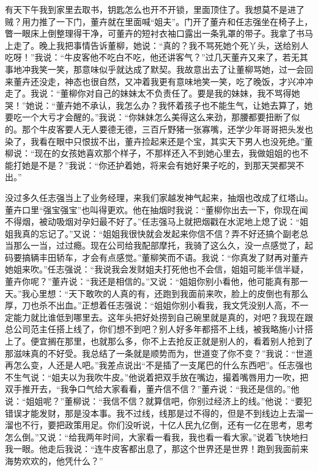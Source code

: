 \documentclass[12pt,oneside]{book}
\begin{document}
有天下午我到家里去取书，钥匙怎么也开不开锁，里面顶住了。我想莫不是进了贼？用力推了一下门，董卉就在里面喊``姐夫''。门开了董卉和任志强坐在椅子上，瞥一眼床上倒整理得干净，可董卉的短衬衣袖口露出一条乳罩的带子。我拿了书马上走了。晚上我把事情告诉董柳，她说：``真的？我不骂死她个死丫头，送给别人吃呀！''我说：``牛皮客他不吃白不吃，他还讲客气？''过几天董卉又来了，若无其事地冲我笑一笑，那意味似乎就达成了默契。我故意出去了让董柳骂她，过一会回来董卉还没走，神态也很自然，又冲着我更有意味地笑一笑，吃了晚饭，才兴冲冲走了。我说：``董柳你对自己的妹妹太不负责任了。要是我的妹妹，我不骂得她哭！''她说：``董卉她不承认，我怎么办？我怀着孩子也不能生气，让她去算了，她要吃一个大亏才会醒的。''我说：``你妹妹怎么美得这么来劲，那腰都要扭断了似的。那个牛皮客要人无人要德无德，三百斤野猪一张寡嘴，还学少年哥哥把头发也染了，我看在眼中只恨拔不出，董卉捡起来还是个宝，其实天下男人也没死绝。''董柳说：``现在的女孩她喜欢那个样子，不那样还入不到她心里去，我做姐姐的也不能打她是不是？''我说：``你还护着她，将来会有她好果子吃的，到那天哭都哭不出。''

没过多久任志强当上了业务经理，来我们家越发神气起来，抽烟也改成了红塔山。董卉口里``强宝强宝''也叫得更欢。他在抽烟时我说：``董柳你出去一下，你现在闻不得烟，被动吸烟对孕妇最不好了。''任志强马上就把烟戳在水泥地上熄了说：``姐姐我真的忘记了。''又说：``姐姐我很快就会发起来你信不信？弄不好还搞个副老总当那么一当，过过瘾。现在公司给我配部摩托，我骑了这么久，没一点感觉了，起码要搞辆丰田轿车，才会有点感觉。''董柳笑而不语。我说：``你真发了财再对董卉她姐来吹。''任志强说：``我说我会发财姐夫打死他也不会信，姐姐可能半信半疑，董卉你呢？''董卉说：``我还是相信的。''又说：``姐姐你别小看他，他可能真有那一天。''我心里想：``天下敢吹的人真的有，还跑到我面前来吹，脸上的皮倒也有那么厚，刀也杀不出血。''正想着任志强说：``姐姐你别小看我，我文凭没别人高，不一定能力就比谁低到哪里去。这年头把好处捞到自己碗里就是真的，对吧？我现在跟总公司范主任搭上线了，你们想不到吧？别人好多年都搭不上线，被我略施小计搭上了。便宜搁在那里，也就那么多，你不上去抢反正就是别人的，看着别人抢到了那滋味真的不好受。我总结了一条就是顺势而为，世道变了你不变？''我说：``世道再怎么变，人还是人吧。''我差点说出``不是插了一支尾巴的什么东西吧''。任志强也不生气说：``姐夫以为我吹牛皮。''他说着把双手放在嘴边，撮着嘴唇用力一吹，把双手推开去，``我争口气给大家看看，董卉信不信？''董卉说：``我还是信的。''他说：``姐姐呢？''董柳说：``我信不信？就算信吧，你别过经济上的线。''他说：``要犯错误才能发财，那是没本事。我不过线，线那是过不得的，但是不到线边上去溜一溜也不行，要把政策用足。你们没听说，十亿人民九亿倒，还有一亿在思考，思考怎么倒。''又说：``给我两年时间，大家看一看我，我也看一看大家。''说着飞快地扫我一眼。他走后我说：``连牛皮客都出息了，那这个世界还是世界！跑到我面前来海势欢欢的，他凭什么？''
\end{document}
